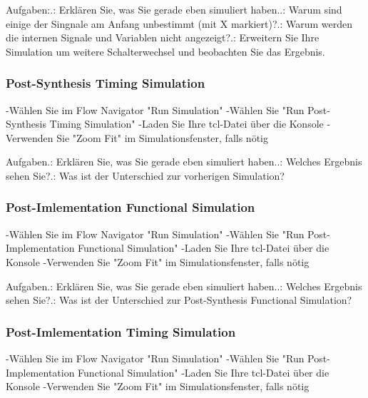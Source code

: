 \documentclass{article}
\begin{document}
Aufgaben:.: Erkl\"aren Sie, was Sie gerade eben simuliert haben..: Warum sind einige der Singnale am Anfang unbestimmt (mit X markiert)?.: Warum werden die internen Signale und Variablen nicht angezeigt?.: Erweitern Sie Ihre Simulation um weitere Schalterwechsel und beobachten Sie das Ergebnis.

\subsubsection{Post-Synthesis Timing Simulation}
-W\"ahlen Sie im Flow Navigator "Run Simulation"\newline
-W\"ahlen Sie "Run Post-Synthesis Timing Simulation"\newline
-Laden Sie Ihre tcl-Datei \"uber die Konsole\newline
-Verwenden Sie "Zoom Fit" im Simulationsfenster, falls n\"otig\newline

Aufgaben.: Erkl\"aren Sie, was Sie gerade eben simuliert haben..: Welches Ergebnis sehen Sie?.: Was ist der Unterschied zur vorherigen Simulation?

\subsubsection{Post-Imlementation Functional Simulation}
-W\"ahlen Sie im Flow Navigator "Run Simulation"\newline
-W\"ahlen Sie "Run Post-Implementation Functional Simulation"\newline
-Laden Sie Ihre tcl-Datei \"uber die Konsole\newline
-Verwenden Sie "Zoom Fit" im Simulationsfenster, falls n\"otig\newline

Aufgaben.: Erkl\"aren Sie, was Sie gerade eben simuliert haben..: Welches Ergebnis sehen Sie?.: Was ist der Unterschied zur Post-Synthesis Functional Simulation?

\subsubsection{Post-Imlementation Timing Simulation}
-W\"ahlen Sie im Flow Navigator "Run Simulation"\newline
-W\"ahlen Sie "Run Post-Implementation Functional Simulation"\newline
-Laden Sie Ihre tcl-Datei \"uber die Konsole\newline
-Verwenden Sie "Zoom Fit" im Simulationsfenster, falls n\"otig\newline
\end{document}
